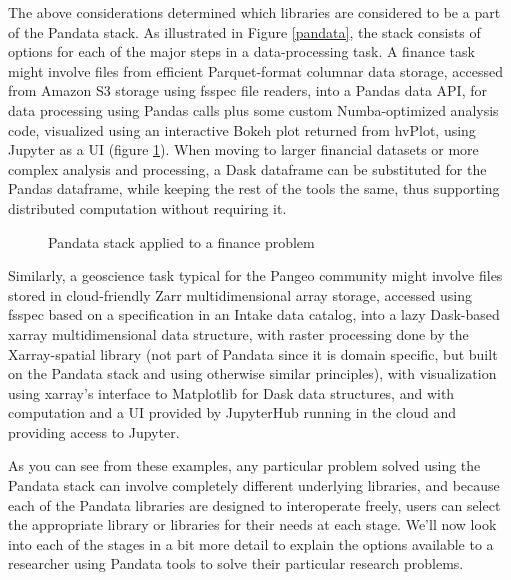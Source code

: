 The above considerations determined which libraries are considered to be a part of the Pandata stack. As illustrated in Figure \ref{pandata}, the stack consists of options for each of the major steps in a data-processing task. A finance task might involve files from efficient Parquet-format columnar data storage, accessed from Amazon S3 storage using fsspec file readers, into a Pandas data API, for data processing using Pandas calls plus some custom Numba-optimized analysis code, visualized using an interactive Bokeh plot returned from hvPlot, using Jupyter as a UI (figure \ref{pandata-finance}). When moving to larger financial datasets or more complex analysis and processing, a Dask dataframe can be substituted for the Pandas dataframe, while keeping the rest of the tools the same, thus supporting distributed computation without requiring it.
\begin{figure}[h]
    \noindent{}
    \caption{Pandata stack applied to a finance problem\label{pandata-finance}}
\end{figure}
Similarly, a geoscience task typical for the Pangeo community might involve files stored in cloud-friendly Zarr multidimensional array storage, accessed using fsspec based on a specification in an Intake data catalog, into a lazy Dask-based xarray multidimensional data structure, with raster processing done by the Xarray-spatial library (not part of Pandata since it is domain specific, but built on the Pandata stack and using otherwise similar principles), with visualization using xarray's interface to Matplotlib for Dask data structures, and with computation and a UI provided by JupyterHub running in the cloud and providing access to Jupyter.

As you can see from these examples, any particular problem solved using the Pandata stack can involve completely different underlying libraries, and because each of the Pandata libraries are designed to interoperate freely, users can select the appropriate library or libraries for their needs at each stage. We'll now look into each of the stages in a bit more detail to explain the options available to a researcher using Pandata tools to solve their particular research problems.


